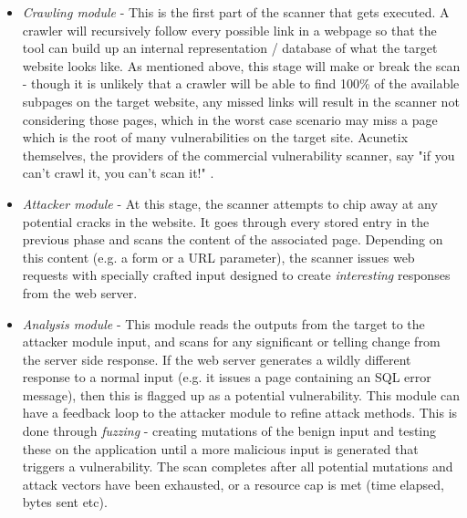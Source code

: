 \begin{itemize}
	
	\item \textit{Crawling module} - This is the first part of the scanner that gets executed. A crawler will recursively follow every possible link in a webpage so that the tool can build up an internal representation / database of what the target website looks like. As mentioned above, this stage will make or break the scan - though it is unlikely that a crawler will be able to find 100\% of the available subpages on the target website, any missed links will result in the scanner not considering those pages, which in the worst case scenario may miss a page which is the root of many vulnerabilities on the target site. Acunetix themselves, the providers of the commercial vulnerability scanner, say "if you can't crawl it, you can't scan it!" \cite{acunetixQuoteCrawling}. 
	
	\item \textit{Attacker module} - At this stage, the scanner attempts to chip away at any potential cracks in the website. It goes through every stored entry in the previous phase and scans the content of the associated page. Depending on this content (e.g. a form or a URL parameter), the scanner issues web requests with specially crafted input designed to create \textit{interesting} responses from the web server.
	
	\item \textit{Analysis module} - This module reads the outputs from the target to the attacker module input, and scans for any significant or telling change from the server side response. If the web server generates a wildly different response to a normal input (e.g. it issues a page containing an SQL error message), then this is flagged up as a potential vulnerability. This module can have a feedback loop to the attacker module to refine attack methods. This is done through \textit{fuzzing} - creating mutations of the benign input and testing these on the application until a more malicious input is generated that triggers a vulnerability. The scan completes after all potential mutations and attack vectors have been exhausted, or a resource cap is met (time elapsed, bytes sent etc).
\end{itemize}


